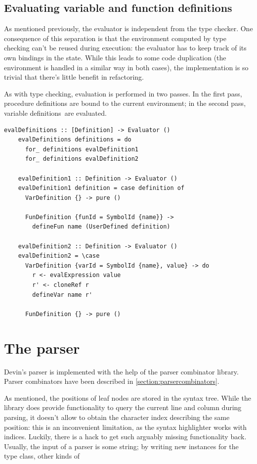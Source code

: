 \documentclass[UdineBachThesis,american,11pt]{PhdThesis}
\begin{document}
  \newpage

  \subsection{Evaluating variable and function definitions}

  As mentioned previously, the evaluator is independent from the type checker.
  One consequence of this separation is that the environment computed by type
  checking can't be reused during execution: the evaluator has to keep track of
  its own bindings in the state. While this leads to some code duplication (the
  environment is handled in a similar way in both cases), the implementation is
  so trivial that there's little benefit in refactoring.

  As with type checking, evaluation is performed in two passes. In the first
  pass, procedure definitions are bound to the current environment; in the
  second pass, variable definitions~are evaluated.

  \begin{lstlisting}[gobble=4,basicstyle=\ttfamily\small]
    evalDefinitions :: [Definition] -> Evaluator ()
    evalDefinitions definitions = do
      for_ definitions evalDefinition1
      for_ definitions evalDefinition2

    evalDefinition1 :: Definition -> Evaluator ()
    evalDefinition1 definition = case definition of
      VarDefinition {} -> pure ()

      FunDefinition {funId = SymbolId {name}} ->
        defineFun name (UserDefined definition)

    evalDefinition2 :: Definition -> Evaluator ()
    evalDefinition2 = \case
      VarDefinition {varId = SymbolId {name}, value} -> do
        r <- evalExpression value
        r' <- cloneRef r
        defineVar name r'

      FunDefinition {} -> pure ()
  \end{lstlisting}

  \section{The parser}

  Devin's parser is implemented with the help of the \lstinline@parsec@ parser
  combinator library. Parser combinators have been described in
  \autoref{section:parsercombinators}.

  As mentioned, the positions of leaf nodes are stored in the syntax tree. While
  the \lstinline@parsec@ library does provide functionality to query the current
  line and column during parsing, it doesn't allow to obtain the character index
  describing the same position: this is an inconvenient limitation, as the
  syntax highlighter works with indices. Luckily, there is a hack to get such
  arguably missing functionality back. Usually, the input of a
  \lstinline@parsec@ parser is some string; by writing new instances for the
  \lstinline@Stream@ type class, other kinds of \linebreak
\end{document}
